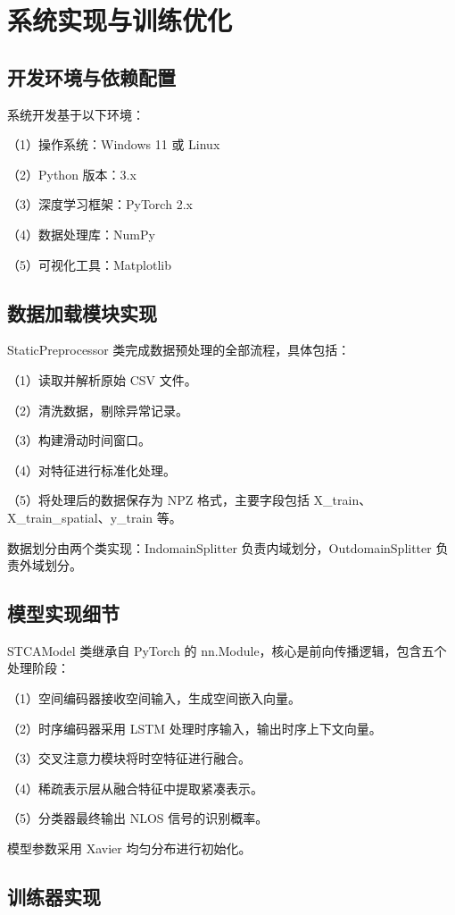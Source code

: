 \chapter{系统实现与训练优化}

\section{开发环境与依赖配置}

系统开发基于以下环境：

（1）操作系统：Windows 11 或 Linux

（2）Python 版本：3.x

（3）深度学习框架：PyTorch 2.x

（4）数据处理库：NumPy

（5）可视化工具：Matplotlib

\section{数据加载模块实现}

StaticPreprocessor 类完成数据预处理的全部流程，具体包括：

（1）读取并解析原始 CSV 文件。

（2）清洗数据，剔除异常记录。

（3）构建滑动时间窗口。

（4）对特征进行标准化处理。

（5）将处理后的数据保存为 NPZ 格式，主要字段包括 X\_train、X\_train\_spatial、y\_train 等。

数据划分由两个类实现：IndomainSplitter 负责内域划分，OutdomainSplitter 负责外域划分。

\section{模型实现细节}

STCAModel 类继承自 PyTorch 的 nn.Module，核心是前向传播逻辑，包含五个处理阶段：

（1）空间编码器接收空间输入，生成空间嵌入向量。

（2）时序编码器采用 LSTM 处理时序输入，输出时序上下文向量。

（3）交叉注意力模块将时空特征进行融合。

（4）稀疏表示层从融合特征中提取紧凑表示。

（5）分类器最终输出 NLOS 信号的识别概率。

模型参数采用 Xavier 均匀分布进行初始化。

\section{训练器实现}

